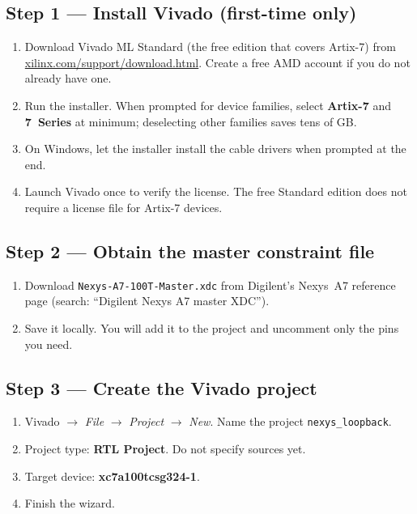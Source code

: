 \documentclass[11pt,letterpaper]{article}
\begin{document}
\subsection{Step 1 --- Install Vivado (first-time only)}
\begin{enumerate}[leftmargin=2em]
	\item Download Vivado ML Standard (the free edition that covers Artix-7) from \\
	      \href{https://www.xilinx.com/support/download.html}{xilinx.com/support/download.html}. Create a free AMD account if you do not already have one.
	\item Run the installer. When prompted for device families, select \textbf{Artix-7} and \textbf{7~Series} at minimum; deselecting other families saves tens of GB.
	\item On Windows, let the installer install the cable drivers when prompted at the end.
	\item Launch Vivado once to verify the license. The free Standard edition does not require a license file for Artix-7 devices.
\end{enumerate}


\subsection{Step 2 --- Obtain the master constraint file}
\begin{enumerate}[leftmargin=2em]
	\item Download \texttt{Nexys-A7-100T-Master.xdc} from Digilent's Nexys~A7 reference page (search: ``Digilent Nexys A7 master XDC'').
	\item Save it locally. You will add it to the project and uncomment only the pins you need.
\end{enumerate}

\newpage
\subsection{Step 3 --- Create the Vivado project}
\begin{enumerate}[leftmargin=2em]
	\item Vivado $\to$ \textit{File} $\to$ \textit{Project} $\to$ \textit{New}. Name the project \texttt{nexys\_loopback}.
	\item Project type: \textbf{\mbox{RTL} Project}. Do not specify sources yet.
	\item Target device: \textbf{xc7a100tcsg324-1}.
	\item Finish the wizard.
\end{enumerate}
\end{document}
